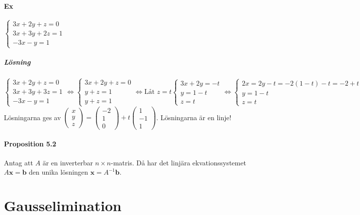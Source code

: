 \paragraph{Ex} $\begin{cases}3x+2y+z=0\\3x+3y+2z=1\\-3x-y=1\end{cases}$
\subparagraph{Lösning} 
$\begin{cases}
    3x+2y+z=0\\
    3x+3y+3z=1\\
    -3x-y=1
\end{cases}\Leftrightarrow
\begin{cases}
    3x+2y+z=0\\
    y+z=1\\
    y+z=1
\end{cases}\Leftrightarrow \text{Låt } z=t
\begin{cases}
    3x+2y=-t\\
    y=1-t\\
    z=t
\end{cases}\Leftrightarrow
\begin{cases}
    2x=2y-t=-2(1-t)-t=-2+t\\
    y=1-t\\
    z=t
\end{cases}$\\
Lösningarna ges av $\begin{pmatrix}
    x\\y\\z
\end{pmatrix}=
\begin{pmatrix}
    -2\\1\\0
\end{pmatrix}+t\begin{pmatrix}
    1\\-1\\1
\end{pmatrix}$.
Lösningarna är en linje!

\paragraph{Proposition 5.2} Antag att $A$ är en inverterbar $n\times n$-matris.
Då har det linjära ekvationssystemet $A\bm{x}=\bm{b}$ den unika lösningen $\bm{x}=A^{-1}\bm{b}$.

\section{Gausselimination}
